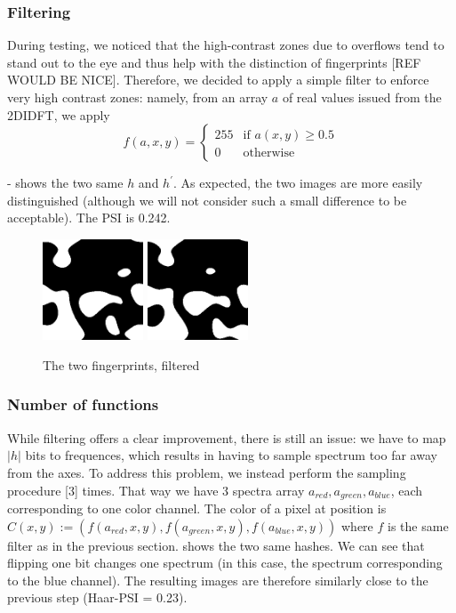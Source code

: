 \documentclass{article}
\begin{document}
\subsubsection{Filtering}

During testing, we noticed that the high-contrast zones due to overflows tend to stand out to the eye and thus help with the distinction of fingerprints [REF WOULD BE NICE]. Therefore, we decided to apply a simple filter to enforce very high contrast zones: namely, from an array $a$ of real values issued from the 2DIDFT, we apply
$$f(a, x,y) = \begin{cases}255 & \text{if }  a(x,y) \geq 0.5\\ 
			0 & \text{otherwise} \end{cases}$$

\begin{center}
- shows the two same $h$ and $h^\prime$. As expected, the two images are more easily distinguished (although we will not consider such a small difference to be acceptable). The PSI is 0.242.

\begin{figure}
    \centering
    \includegraphics[width=3cm]{figures/Filtered.png}
    \hspace{4pt}
    \includegraphics[width=3cm]{figures/FilteredP67Psi0242.png}
    \caption{The two fingerprints, filtered}
    \label{fig:oneFunc}
\end{figure}
\end{center}

\subsubsection{Number of functions}
\label{rgbSect}

While filtering offers a clear improvement, there is still an issue: we have to map $|h|$ bits to frequences, which results in having to sample spectrum too far away from the axes. To address this problem, we instead perform the sampling procedure [3] times. That way we have 3 spectra array $a_{red}, a_{green}, a_{blue}$, each corresponding to one color channel. The color of a pixel at position is $C(x,y) := (f(a_{red}, x, y), f(a_{green}, x, y), f(a_{blue}, x, y))$ where $f$ is the same filter as in the previous section.  shows the two same hashes. We can see that flipping one bit changes one spectrum (in this case, the spectrum corresponding to the blue channel). The resulting images are therefore similarly close to the previous step (Haar-PSI = 0.23).
\end{document}
